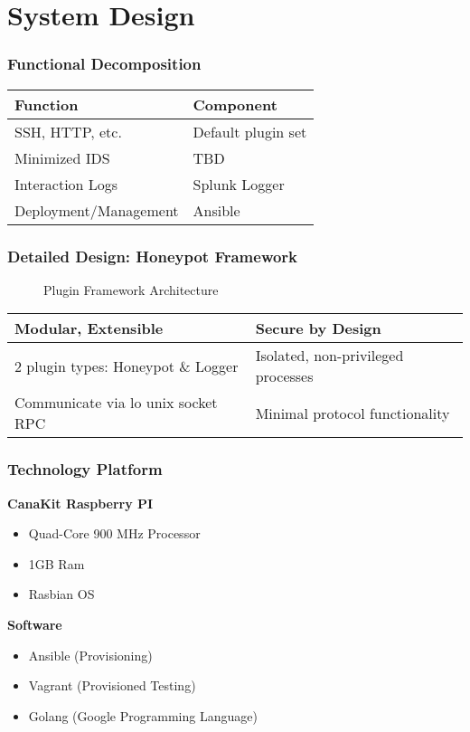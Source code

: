 \section{System Design}

\begin{frame}
\frametitle{Functional Decomposition}
\centering

\begin{tabular}{l | l}
\toprule
\textbf{Function} & \textbf{Component} \\
\midrule
SSH, HTTP, etc. & Default plugin set \\
Minimized IDS & TBD \\
Interaction Logs & Splunk Logger \\
Deployment/Management & Ansible\\

\bottomrule
\end{tabular}

\end{frame}

\begin{frame}
\frametitle{Detailed Design: Honeypot Framework}

\begin{figure}
\centering
\caption{Plugin Framework Architecture}
{
\scalebox{0.7}{}
}
\end{figure}

\begin{table}
\centering
\small
\begin{tabularx}{\linewidth}{l l}
\textbf{Modular, Extensible} & \textbf{Secure by Design} \\
\midrule
2 plugin types: Honeypot \& Logger & Isolated, non-privileged processes \\
Communicate via lo unix socket RPC & Minimal protocol functionality \\
\end{tabularx}
\end{table}
\end{frame}

\begin{frame}
\frametitle{Technology Platform}
\textbf{CanaKit Raspberry PI}
\begin{itemize}
\item Quad-Core 900 MHz Processor
\item 1GB Ram
\item Rasbian OS
\end{itemize}

\textbf{Software}
\begin{itemize}
\item Ansible (Provisioning)
\item Vagrant (Provisioned Testing)
\item Golang (Google Programming Language)
\end{itemize}


\end{frame}

